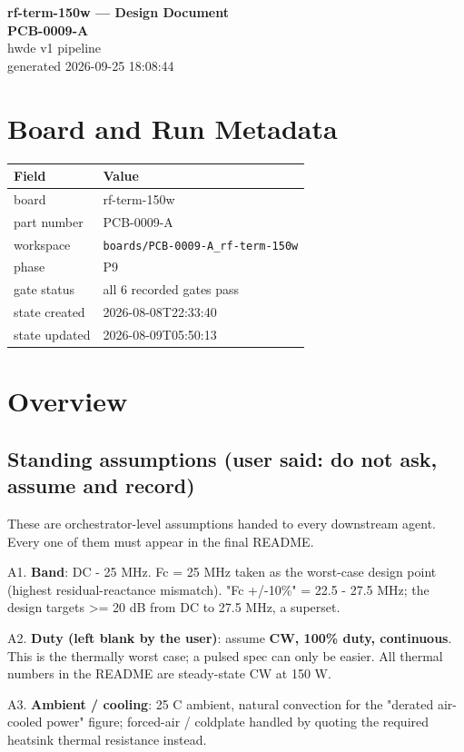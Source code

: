 \documentclass[11pt,a4paper]{article}
\begin{document}
\sloppy
\begin{center}
{\LARGE\bfseries rf-term-150w --- Design Document}\\[6pt]
{\Large\bfseries PCB-0009-A}\\[6pt]
{\large hwde v1 pipeline}\\[2pt]
generated 2026-09-25 18:08:44
\end{center}
\tableofcontents

\section{Board and Run Metadata}
{\small
\begin{longtable}{lp{11cm}}
\toprule
\textbf{Field} & \textbf{Value} \\
\midrule
\endhead
board & rf-term-150w \\
part number & PCB-0009-A \\
workspace & \texttt{boards/PCB-0009-A\_rf-term-150w} \\
phase & P9 \\
gate status & all 6 recorded gates pass \\
state created & 2026-08-08T22:33:40 \\
state updated & 2026-08-09T05:50:13 \\
\bottomrule
\end{longtable}
}
\section{Overview}
\subsection*{Standing assumptions (user said: do not ask, assume and record)}
These are orchestrator-level assumptions handed to every downstream agent. Every one of them must appear in the final README.

A1. \textbf{Band}: DC - 25 MHz. Fc = 25 MHz taken as the worst-case design point (highest residual-reactance mismatch). "Fc +/-10\%" = 22.5 - 27.5 MHz; the design targets \textgreater{}= 20 dB from DC to 27.5 MHz, a superset.

A2. \textbf{Duty (left blank by the user)}: assume \textbf{CW, 100\% duty, continuous}. This is the thermally worst case; a pulsed spec can only be easier. All thermal numbers in the README are steady-state CW at 150 W.

A3. \textbf{Ambient / cooling}: 25 C ambient, natural convection for the "derated air-cooled power" figure; forced-air / coldplate handled by quoting the required heatsink thermal resistance instead.
\end{document}
